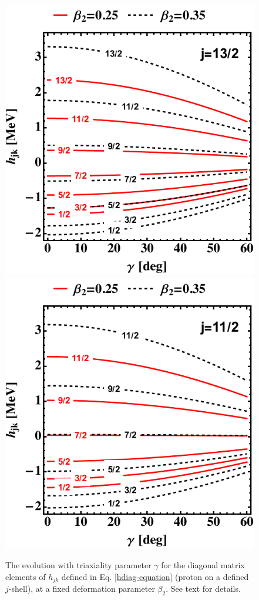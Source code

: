 \begin{figure}
    \centering
    \includegraphics[scale=0.7]{Chapters/Figures/hdiag-gamma-1.pdf}
    \includegraphics[scale=0.7]{Chapters/Figures/hdiag-gamma-2.pdf}
    \caption{The evolution with triaxiality parameter $\gamma$ for the diagonal matrix elements of $h_{jk}$ defined in Eq. \ref{hdiag-equation} (proton on a defined $j$-shell), at a fixed deformation parameter $\beta_2$. See text for details.}
    \label{hdiag-gamma-evolution}
\end{figure}

